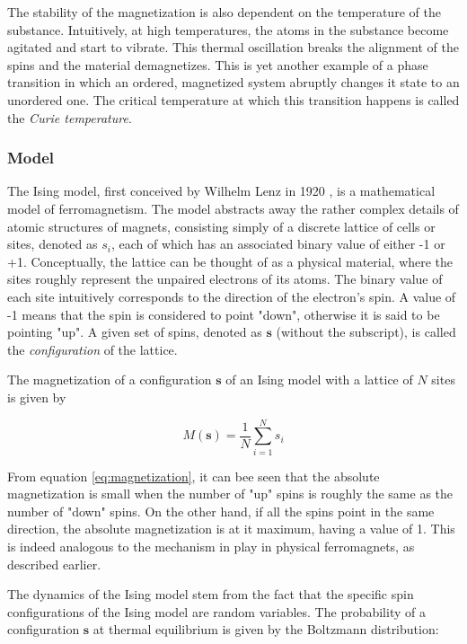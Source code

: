 \documentclass[12pt]{article}
\begin{document}
The stability of the magnetization is also dependent on the temperature of the substance. Intuitively, at high temperatures, the atoms in the substance become agitated and start to vibrate. This thermal oscillation breaks the alignment of the spins and the material demagnetizes. This is yet another example of a phase transition in which an ordered, magnetized system abruptly changes it state to an unordered one. The critical temperature at which this transition happens is called the \textit{Curie temperature}.


\subsubsection{Model} 

The Ising model, first conceived by Wilhelm Lenz in 1920 \cite{ising-history}, is a mathematical model of ferromagnetism. The model abstracts away the rather complex details of atomic structures of magnets, consisting simply of a discrete lattice of cells or sites, denoted as $s_i$, each of which has an associated binary value of either -1 or +1. Conceptually, the lattice can be thought of as a physical material, where the sites roughly represent the unpaired electrons of its atoms. The binary value of each site intuitively corresponds to the direction of the electron's spin. A value of -1 means that the spin is considered to point "down", otherwise it is said to be pointing "up". A given set of spins, denoted as $\boldsymbol{s}$ (without the subscript), is called the \textit{configuration} of the lattice. \cite{statistical-mechanics}

The magnetization of a configuration $\boldsymbol{s}$ of an Ising model with a lattice of $N$ sites is given by 

\begin{equation}
M(\boldsymbol{s}) = \frac{1}{N} \sum_{i=1}^N s_i
\label{eq:magnetization}
\end{equation}

From equation \ref{eq:magnetization}, it can bee seen that the absolute magnetization is small when the number of "up" spins is roughly the same as the number of "down" spins. On the other hand, if all the spins point in the same direction, the absolute magnetization is at it maximum, having a value of 1. This is indeed analogous to the mechanism in play in physical ferromagnets, as described earlier. 

The dynamics of the Ising model stem from the fact that the specific spin configurations of the Ising model are random variables. The probability of a configuration $\boldsymbol{s}$ at thermal equilibrium is given by the Boltzmann distribution: 
\end{document}
